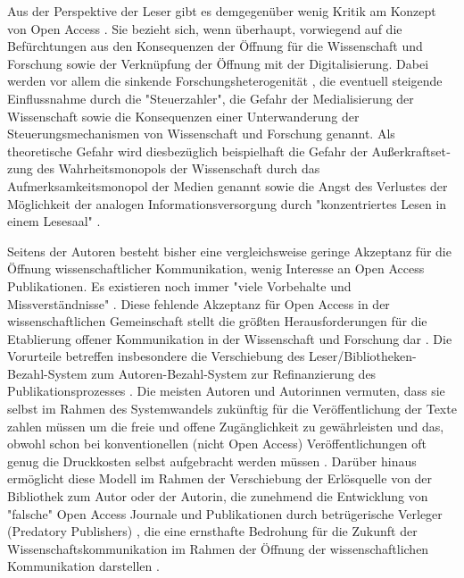 Aus der Perspektive der Leser gibt es demgegenüber wenig Kritik am Konzept von Open Access \cite{wein_2010_erwerbung} \cite{weishaupt_2009_goldenOA}. Sie bezieht sich, wenn überhaupt, vorwiegend auf die Befürchtungen aus den Konsequenzen der Öffnung für die Wissenschaft und Forschung sowie der Verknüpfung der Öffnung mit der Digitalisierung. Dabei werden vor allem die sinkende Forschungsheterogenität \cite{Hirschi_2015_buch_oa}, die eventuell steigende Einflussnahme durch die "Steuerzahler", die Gefahr der Medialisierung der Wissenschaft \cite{weingart_2005_wissenschaft} sowie die Konsequenzen einer Unterwanderung der Steuerungsmechanismen von Wissenschaft und Forschung genannt. Als theoretische Gefahr wird diesbezüglich beispielhaft die Gefahr der Au­ßer­kraft­set­zung des Wahrheitsmonopols der Wissenschaft durch das Aufmerksamkeitsmonopol der Medien genannt \cite{weingart_2005_wissenschaft} sowie die Angst des Verlustes der Möglichkeit der analogen Informationsversorgung durch "konzentriertes Lesen in einem Lesesaal" \cite{winkler_2011_anforderungen}.

Seitens der Autoren besteht bisher eine vergleichsweise geringe Akzeptanz für die Öffnung wissenschaftlicher Kommunikation, wenig Interesse an Open Access Publikationen. Es existieren noch immer "viele Vorbehalte und Missverständnisse" \cite{Suber_2002}. Diese fehlende Akzeptanz für Open Access in der wissenschaftlichen Gemeinschaft stellt die größten Herausforderungen für die Etablierung offener Kommunikation in der Wissenschaft und Forschung dar \cite{weishaupt_2009_goldenOA}. Die Vorurteile betreffen insbesondere die Verschiebung des Leser/Bibliotheken-Bezahl-System zum Autoren-Bezahl-System zur Refinanzierung des Publikationsprozesses \cite{EuropeanCommission_sciencepub_2006} \cite{Chibnik_2015}. Die meisten Autoren und Autorinnen vermuten, dass sie selbst im Rahmen des Systemwandels zukünftig für die Veröffentlichung der Texte zahlen müssen um die freie und offene Zugänglichkeit zu gewährleisten \cite{Mussell_2013} und das, obwohl schon bei konventionellen (nicht Open Access) Veröffentlichungen oft genug die Druckkosten selbst aufgebracht werden müssen \cite{weishaupt_2009_goldenOA}. Darüber hinaus ermöglicht diese Modell im Rahmen der Verschiebung der Erlösquelle von der Bibliothek zum Autor oder der Autorin, die zunehmend die Entwicklung von "falsche" Open Access Journale und Publikationen durch betrügerische Verleger (Predatory Publishers) \cite{Beall_Predatory_2015}, die eine ernsthafte Bedrohung für die Zukunft der Wissenschaftskommunikation im Rahmen der Öffnung der wissenschaftlichen Kommunikation darstellen \cite{Beall_2012}.


